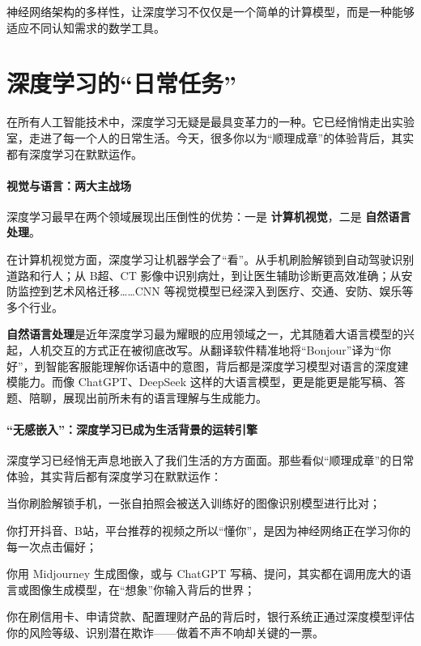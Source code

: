 
神经网络架构的多样性，让深度学习不仅仅是一个简单的计算模型，而是一种能够适应不同认知需求的数学工具。

\section{深度学习的“日常任务”}
在所有人工智能技术中，深度学习无疑是最具变革力的一种。它已经悄悄走出实验室，走进了每一个人的日常生活。今天，很多你以为“顺理成章”的体验背后，其实都有深度学习在默默运作。

\paragraph{视觉与语言：两大主战场}
深度学习最早在两个领域展现出压倒性的优势：一是 {\bf 计算机视觉}，二是 {\bf 自然语言处理}。

在计算机视觉方面，深度学习让机器学会了“看”。从手机刷脸解锁到自动驾驶识别道路和行人；从 B超、CT 影像中识别病灶，到让医生辅助诊断更高效准确；从安防监控到艺术风格迁移……CNN 等视觉模型已经深入到医疗、交通、安防、娱乐等多个行业。

 {\bf 自然语言处理}是近年深度学习最为耀眼的应用领域之一，尤其随着大语言模型的兴起，人机交互的方式正在被彻底改写。从翻译软件精准地将“Bonjour”译为“你好”，到智能客服能理解你话语中的意图，背后都是深度学习模型对语言的深度建模能力。而像 ChatGPT、DeepSeek 这样的大语言模型，更是能更是能写稿、答题、陪聊，展现出前所未有的语言理解与生成能力。
 
 \paragraph{“无感嵌入”：深度学习已成为生活背景的运转引擎}
深度学习已经悄无声息地嵌入了我们生活的方方面面。那些看似“顺理成章”的日常体验，其实背后都有深度学习在默默运作：

当你刷脸解锁手机，一张自拍照会被送入训练好的图像识别模型进行比对；

你打开抖音、B站，平台推荐的视频之所以“懂你”，是因为神经网络正在学习你的每一次点击偏好；

你用 Midjourney 生成图像，或与 ChatGPT 写稿、提问，其实都在调用庞大的语言或图像生成模型，在“想象”你输入背后的世界；

你在刷信用卡、申请贷款、配置理财产品的背后时，银行系统正通过深度模型评估你的风险等级、识别潜在欺诈——做着不声不响却关键的一票。

